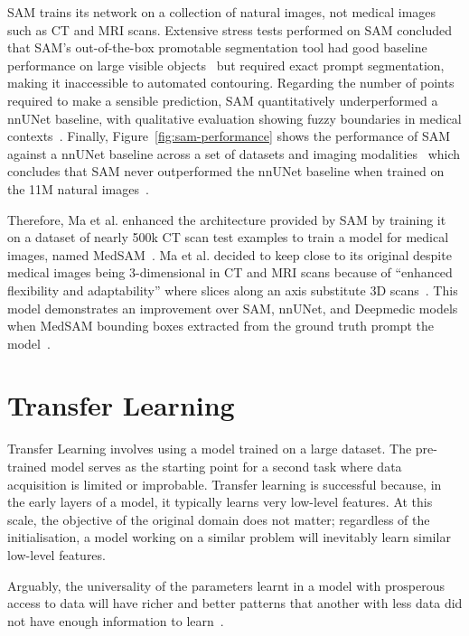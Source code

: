 \documentclass[11pt,twoside]{report}
\begin{document}
SAM trains its network on a collection of natural images, not medical images such as CT and MRI scans. Extensive stress tests performed on SAM concluded that SAM's out-of-the-box promotable segmentation tool had good baseline performance on large visible objects~\cite{deng2023segment} but required exact prompt segmentation, making it inaccessible to automated contouring. Regarding the number of points required to make a sensible prediction, SAM quantitatively underperformed a nnUNet baseline, with qualitative evaluation showing fuzzy boundaries in medical contexts~\cite{hu2023sam}. Finally, Figure~\ref{fig:sam-performance} shows the performance of SAM against a nnUNet baseline across a set of datasets and imaging modalities~\cite{he2023computervision} which concludes that SAM never outperformed the nnUNet baseline when trained on the 11M natural images~\cite{SAM}. 

Therefore, Ma et al. enhanced the architecture provided by SAM by training it on a dataset of nearly 500k CT scan test examples to train a model for medical images, named MedSAM~\cite{Ma2024}. Ma et al. decided to keep close to its original despite medical images being 3-dimensional in CT and MRI scans because of ``enhanced flexibility and adaptability'' where slices along an axis substitute 3D scans~\cite{Ma2024}. This model demonstrates an improvement over SAM, nnUNet, and Deepmedic models when MedSAM bounding boxes extracted from the ground truth prompt the model~\cite{Ma2024}.

\section{Transfer Learning}

Transfer Learning involves using a model trained on a large dataset. The pre-trained model serves as the starting point for a second task where data acquisition is limited or improbable. Transfer learning is successful because, in the early layers of a model, it typically learns very low-level features. At this scale, the objective of the original domain does not matter; regardless of the initialisation, a model working on a similar problem will inevitably learn similar low-level features. 

Arguably, the universality of the parameters learnt in a model with prosperous access to data will have richer and better patterns that another with less data did not have enough information to learn~\cite{deep-learning-book, survey-on-transfer-learning}.
\end{document}
